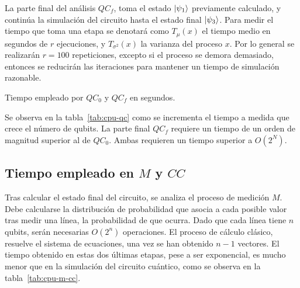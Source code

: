 La parte final del análisis $QC_f$, toma el estado $\ket{\psi_{1}}$ previamente 
calculado, y continúa la simulación del circuito hasta el estado final $\ket{\psi_{3}}$. Para medir el tiempo que toma una etapa se denotará como $T_\mu(x)$ el 
tiempo medio en segundos de $r$ ejecuciones, y $T_{\sigma^2}(x)$ la varianza del 
proceso $x$. Por lo general se realizarán $r = 100$ repeticiones, excepto si el 
proceso se demora demasiado, entonces se reducirán las iteraciones para mantener 
un tiempo de simulación razonable.

\begin{table}[!htb]
\centering
{}
\caption{Tiempo empleado por $QC_0$ y $QC_f$ en segundos.}
\label{tab:cpu-qc}
\end{table}

Se observa en la tabla~\ref{tab:cpu-qc} como se incrementa el tiempo a medida 
que crece el número de qubits. La parte final $QC_f$ requiere un tiempo de un 
orden de magnitud superior al de $QC_0$. Ambas requieren un tiempo superior a 
$O(2^N)$.

\subsection{Tiempo empleado en $M$ y $CC$}
Tras calcular el estado final del circuito, se analiza el proceso de medición 
$M$. Debe calcularse la distribución de probabilidad que asocia a cada posible 
valor tras medir una línea, la probabilidad de que ocurra. Dado que cada línea 
tiene $n$ qubits, serán necesarias $O(2^n)$ operaciones. El proceso de cálculo 
clásico, resuelve el sistema de ecuaciones, una vez se han obtenido $n-1$ 
vectores.
El tiempo obtenido en estas dos últimas etapas, pese a ser exponencial, es mucho 
menor que en la simulación del circuito cuántico, como se observa en la 
tabla~\ref{tab:cpu-m-cc}.


